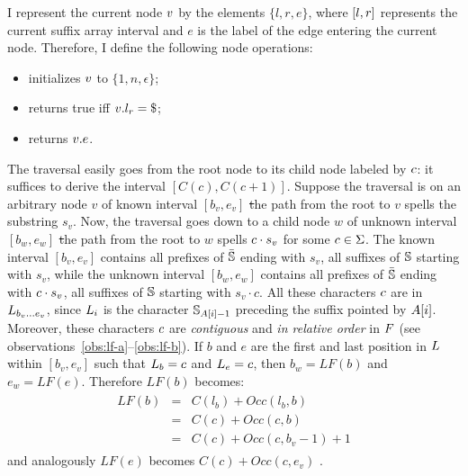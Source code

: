 I represent the current node $v$ by the elements $\{ l, r, e \}$, where $[l,r]$ represents the current suffix array interval and $e$ is the label of the edge entering the current node.
Therefore, I define the following node operations:
\begin{itemize}
\item {} initializes $v$ to $\{ 1, n, \epsilon \}$;
\item {} returns true iff $\StrieNode.l_r = \$$;
\item {} returns $v.e$.
\end{itemize}

The traversal easily goes from the root node to its child node labeled by $c$: it suffices to derive the interval $[C(c),C(c+1)]$.
Suppose the traversal is on an arbitrary node $v$ of known interval $[b_v, e_v]$ \st the path from the root to $v$ spells the substring $s_v$.
Now, the traversal goes down to a child node $w$ of unknown interval $[b_w, e_w]$ \st the path from the root to $w$ spells $c \cdot s_v$ for some $c \in \Sigma$.
The known interval $[b_v, e_v]$ contains all prefixes of $\bar{\mathbb{S}}$ ending with $s_v$, \ie all suffixes of $\mathbb{S}$ starting with $s_v$, while the unknown interval $[b_w, e_w]$ contains all prefixes of $\bar{\mathbb{S}}$ ending with $c \cdot s_v$, \ie all suffixes of $\mathbb{S}$ starting with $s_v \cdot c$.
All these characters $c$ are in $L_{b_v \dots e_v}$, since $L_i$ is the character $\mathbb{S}_{A[i] - 1}$ preceding the suffix pointed by $A[i]$.
Moreover, these characters $c$ are \emph{contiguous} and \emph{in relative order} in $F$ (see observations~\ref{obs:lf-a}--\ref{obs:lf-b}).
If $b$ and $e$ are the first and last position in $L$ within $[b_v, e_v]$ such that $L_b = c$ and $L_e = c$, then $b_w = LF(b)$ and $e_w = LF(e)$.
Therefore $LF(b)$ becomes:
\begin{eqnarray}
\begin{array}{lcl}
LF(b) &=& C(l_b) + Occ(l_b, b)\\
 	  &=& C(c) + Occ(c, b)\\
	  &=& C(c) + Occ(c, b_v - 1) + 1
\end{array}
\end{eqnarray}
and analogously $LF(e)$ becomes $C(c) + Occ(c, e_v)$ \cite{Ferragina2000}.

